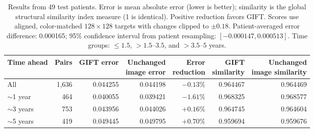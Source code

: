 \documentclass[10pt,letterpaper]{article}
\begin{document}
\begin{table}[!ht]
\centering\small
\setlength{\tabcolsep}{3pt}
\begin{tabular}{@{}lrrrrrr@{}}
\toprule
\textbf{Time ahead} & \textbf{Pairs} & \textbf{GIFT error} & \shortstack{\textbf{Unchanged}\\\textbf{image error}} & \shortstack{\textbf{Error}\\\textbf{reduction}} & \shortstack{\textbf{GIFT}\\\textbf{similarity}} & \shortstack{\textbf{Unchanged}\\\textbf{image similarity}}\\
\midrule
All & 1,636 & 0.044255 & 0.044198 & $-0.13\%$ & 0.964467 & 0.964469\\
$\sim$1 year & 464 & 0.040055 & 0.039421 & $-1.61\%$ & 0.968325 & 0.968577\\
$\sim$3 years & 753 & 0.043956 & 0.044026 & $+0.16\%$ & 0.964745 & 0.964604\\
$\sim$5 years & 419 & 0.049445 & 0.049795 & $+0.70\%$ & 0.959694 & 0.959676\\
\bottomrule
\end{tabular}
\caption{Results from 49 test patients. Error is mean absolute error (lower is better); similarity is the global structural similarity index measure (1 is identical). Positive reduction favors GIFT. Scores use aligned, color-matched $128\times128$ targets with changes clipped to $\pm0.18$. Patient-averaged error difference: 0.000165; 95\% confidence interval from patient resampling: $[-0.000147,0.000513]$. Time groups: $\leq1.5$, $>1.5$--$3.5$, and $>3.5$--$5$ years.}
\label{tab:heldout}
\end{table}
\end{document}
